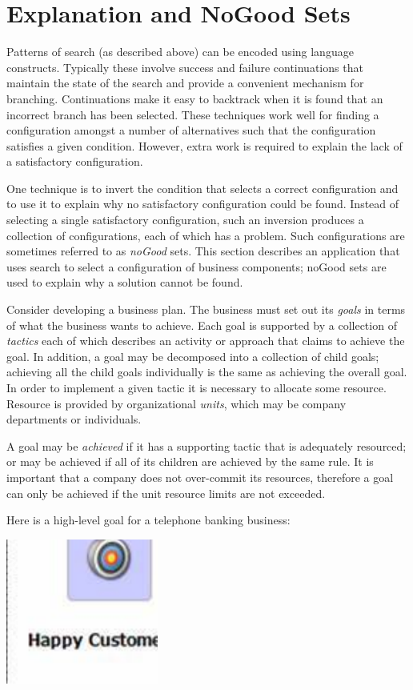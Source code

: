 \section{Explanation and NoGood Sets}

Patterns of search (as described above) can be encoded using language
constructs. Typically these involve success and failure continuations
that maintain the state of the search and provide a convenient mechanism
for branching. Continuations make it easy to backtrack when it is
found that an incorrect branch has been selected. These techniques
work well for finding a configuration amongst a number of alternatives
such that the configuration satisfies a given condition. However,
extra work is required to explain the lack of a satisfactory configuration. 

One technique is to invert the condition that selects a correct configuration
and to use it to explain why no satisfactory configuration could be
found. Instead of selecting a single satisfactory configuration, such
an inversion produces a collection of configurations, each of which
has a problem. Such configurations are sometimes referred to as \emph{noGood}
sets. This section describes an application that uses search to select
a configuration of business components; noGood sets are used to explain
why a solution cannot be found.

Consider developing a business plan. The business must set out its
\emph{goals} in terms of what the business wants to achieve. Each
goal is supported by a collection of \emph{tactics} each of which
describes an activity or approach that claims to achieve the goal.
In addition, a goal may be decomposed into a collection of child goals;
achieving all the child goals individually is the same as achieving
the overall goal. In order to implement a given tactic it is necessary
to allocate some resource. Resource is provided by organizational
\emph{units}, which may be company departments or individuals.

A goal may be \emph{achieved} if it has a supporting tactic that is
adequately resourced; or may be achieved if all of its children are
achieved by the same rule. It is important that a company does not
over-commit its resources, therefore a goal can only be achieved if
the unit resource limits are not exceeded.

Here is a high-level goal for a telephone banking business:

\begin{center}
\includegraphics[width=5cm]{LanguageEngineering/Choice/Images/Goal}
\end{center}

